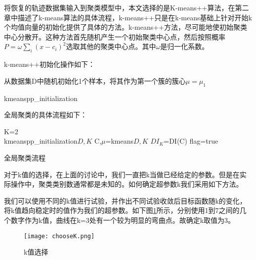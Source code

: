 将恢复的轨迹数据集输入到聚类模型中，本文选择的是K-means++算法，在第二章中描述了k-means算法的具体流程，k-means++只是在k-means基础上针对开始k个均值向量的初始化提供了具体的方法。k-means++方法，尽可能地使初始聚类中心分散开。这种方法首先随机产生一个初始聚类中心点，然后按照概率$P=\omega \sum_i{\left( x-c_i \right) ^2}$选取其他的聚类中心点。其中$\omega$是归一化系数。

k-means++初始化操作如下：\\
\begin{algorithm}[H]
	 从数据集D中随机初始化1个样本，将其作为第一个簇的簇心$\mu={\mu_1}$\;
	 \caption{kmeanspp_initialization}
\end{algorithm}

全局聚类的具体流程如下：\\
\begin{algorithm}[H]
	\label{kmeanspp}
	 K=2\;\\
	 kmeanspp_initialization\(D,K\)\;
	 C,$\mu$=kmeans\(D,K\)\;
	 $DI_K$=DI(C)\;
	 flag=true\;
	 \caption{全局聚类流程}
\end{algorithm}

对于k值的选择，在上面的讨论中，我们一直把k当做已经给定的参数。但是在实际操作中，聚类类别数通常都是未知的。如何确定超参数k我们采用如下方法。

我们可以使用不同的k值进行试验，并作出不同试验收敛后目标函数随k的变化，将k值趋向稳定时的值作为我们的超参数。如下图\ref{chooseK}所示，分别使用1到7之间的几个数字作为k值，曲线在k=3处有一个较为明显的弯曲点。故确定k取值为3。
\begin{figure}[H]
	\texttt{[image: chooseK.png]}
	\caption{k值选择}
	\label{chooseK}
\end{figure}

